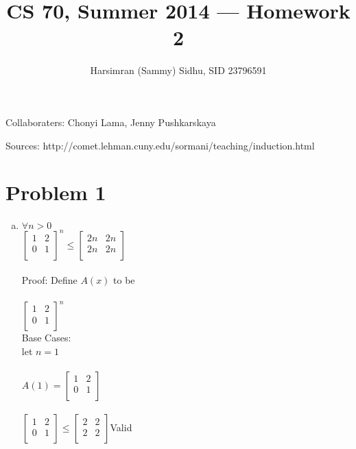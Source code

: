 \documentclass[11pt,letterpaper]{article}
\title{CS 70, Summer 2014 --- Homework 2} %
\author{Harsimran (Sammy) Sidhu, SID 23796591} %
\begin{document}
\maketitle

Collaboraters: Chonyi Lama, Jenny Pushkarskaya

Sources: http://comet.lehman.cuny.edu/sormani/teaching/induction.html

\section*{Problem 1} %

\begin{enumerate}[(a)]
\item
$\forall n>0$\\
 $\left[ {\begin{array}{cc}
   1 & 2 \\
   0 & 1 \\
  \end{array} } \right]^n 
  \leq 
   \left[ {\begin{array}{cc}
   2n & 2n \\
   2n & 2n \\
  \end{array} } \right]$\\
  \\
  Proof: Define $A(x)$ to be\\\\
   $\left[ {\begin{array}{cc}
   1 & 2 \\
   0 & 1 \\
  \end{array} } \right]^n$ \\
  
  Base Cases:\\
  let $n=1$\\\\
  $A(1) = 
   \left[ {\begin{array}{cc}
   1 & 2 \\
   0 & 1 \\
  \end{array} } \right]$\\\\
   $\left[ {\begin{array}{cc}
   1 & 2 \\
   0 & 1 \\
  \end{array} } \right]
  \leq    \left[ {\begin{array}{cc}
   2 & 2 \\
   2 & 2 \\
  \end{array} } \right]$\hfill Valid\\
  

\end{enumerate}
\end{document}
